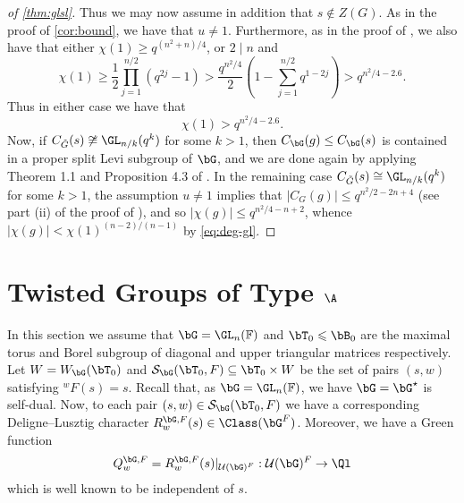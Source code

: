 \documentclass[eqthmnum,nocolour,skinny]{jt-calcs}
\begin{document}
\begin{proof}[of \cref{thm:glsl}]
Thus we may now assume in addition that 
$s \notin Z(G)$. As in the proof of \cref{cor:bound}, we have that $u \neq 1$. Furthermore, as in the proof of 
\cite[Thm.~1.5]{bezrukavnikov-liebeck-shalev-tiep:2017:character-bounds-grps-Lie-type}, we also have that either $\chi(1) \geq q^{(n^2+n)/4}$,
or $2 \mid n$ and
\begin{equation*}
\chi(1) \geq \frac{1}{2}\prod^{n/2}_{j=1}(q^{2j}-1) > \frac{q^{n^2/4}}{2}\left(1 - \sum^{n/2}_{j=1}q^{1-2j} \right) > q^{n^2/4-2.6}.
\end{equation*}
Thus in either case we have that
\begin{equation}\label{eq:deg-gl}
  \chi(1) > q^{n^2/4-2.6}.
\end{equation}  
Now, if $C_{\tilde G}(s) \not\cong \GL_{n/k}(q^k)$ for some $k > 1$, then $C_\bG(g) \leq C_\bG(s)$ is contained in a proper split Levi subgroup of $\bG$,
and we are done again by applying Theorem 1.1 and Proposition 4.3 of \cite{bezrukavnikov-liebeck-shalev-tiep:2017:character-bounds-grps-Lie-type}.
In the remaining case $C_{\tilde G}(s) \cong \GL_{n/k}(q^k)$ for some $k > 1$,  the assumption $u \neq 1$ implies that
$|C_G(g)| \leq q^{n^2/2-2n+4}$ (see part (ii) of the proof of \cite[Thm.~1.5]{bezrukavnikov-liebeck-shalev-tiep:2017:character-bounds-grps-Lie-type}),
and so $|\chi(g)| \leq q^{n^2/4-n+2}$, whence $|\chi(g)| < \chi(1)^{(n-2)/(n-1)}$ by \eqref{eq:deg-gl}.
\end{proof}

\section{\texorpdfstring{Twisted Groups of Type $\A$}{Twisted Groups of Type A}}\label{sec:twisted-type-A}
\begin{pa}
In this section we assume that $\bG = \GL_n(\mathbb{F})$ and $\bT_0 \leqslant \bB_0$ are the maximal torus and Borel subgroup of diagonal and upper triangular matrices respectively. Let $W = W_{\bG}(\bT_0)$ and $\mathcal{S}_{\bG}(\bT_0,F) \subseteq \bT_0\times W$ be the set of pairs $(s,w)$ satisfying ${}^wF(s) = s$. Recall that, as $\bG = \GL_n(\mathbb{F})$, we have $\bG = \bG^{\star}$ is self-dual. Now, to each pair $(s,w) \in \mathcal{S}_{\bG}(\bT_0,F)$ we have a corresponding Deligne--Lusztig character $R_w^{\bG,F}(s) \in \Class(\bG^F)$. Moreover, we have a Green function
\begin{equation*}
Q_w^{\bG,F} = R_w^{\bG,F}(s)|_{\mathcal{U}(\bG)^F} : \mathcal{U}(\bG)^F \to \Ql
\end{equation*}
which is well known to be independent of $s$.
\end{pa}
\end{document}
